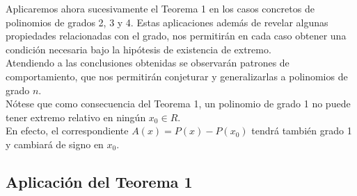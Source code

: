 \documentclass[12pt]{article}
\begin{document}
Aplicaremos ahora sucesivamente el Teorema 1 en los casos concretos de polinomios de grados 2, 3 y 4. Estas aplicaciones además de revelar algunas propiedades relacionadas con el grado, nos permitirán en cada caso obtener una condición necesaria bajo la hipótesis de existencia de extremo. \\
Atendiendo a las conclusiones obtenidas se observarán patrones de comportamiento, que nos permitirán conjeturar y generalizarlas a polinomios de grado $n$. \\
Nótese que como consecuencia del Teorema 1, un polinomio de grado 1 no puede tener extremo relativo en ningún ${x}_0 \in R$. \\
En efecto, el correspondiente $A(x)=P(x)-P({x}_0)$ tendrá también grado 1 y cambiará de signo en ${x}_0$.

\subsection{
  Aplicación del Teorema 1
}
\end{document}
